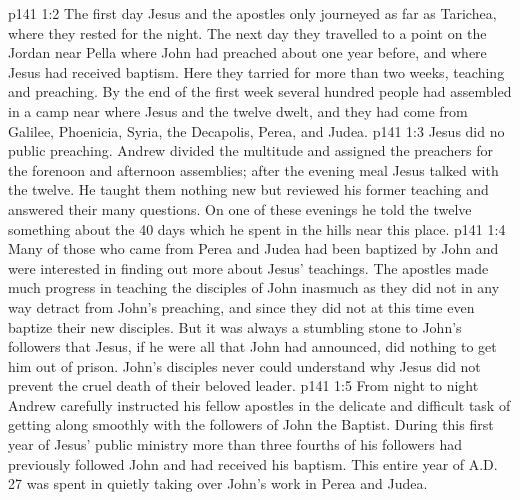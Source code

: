 \vs p141 1:2 The first day Jesus and the apostles only journeyed as far as Tarichea, where they rested for the night. The next day they travelled to a point on the Jordan near Pella where John had preached about one year before, and where Jesus had received baptism. Here they tarried for more than two weeks, teaching and preaching. By the end of the first week several hundred people had assembled in a camp near where Jesus and the twelve dwelt, and they had come from Galilee, Phoenicia, Syria, the Decapolis, Perea, and Judea.
\vs p141 1:3 Jesus did no public preaching. Andrew divided the multitude and assigned the preachers for the forenoon and afternoon assemblies; after the evening meal Jesus talked with the twelve. He taught them nothing new but reviewed his former teaching and answered their many questions. On one of these evenings he told the twelve something about the 40 days which he spent in the hills near this place.
\vs p141 1:4 Many of those who came from Perea and Judea had been baptized by John and were interested in finding out more about Jesus’ teachings. The apostles made much progress in teaching the disciples of John inasmuch as they did not in any way detract from John’s preaching, and since they did not at this time even baptize their new disciples. But it was always a stumbling stone to John’s followers that Jesus, if he were all that John had announced, did nothing to get him out of prison. John’s disciples never could understand why Jesus did not prevent the cruel death of their beloved leader.
\vs p141 1:5 From night to night Andrew carefully instructed his fellow apostles in the delicate and difficult task of getting along smoothly with the followers of John the Baptist. During this first year of Jesus’ public ministry more than three fourths of his followers had previously followed John and had received his baptism. This entire year of A.D.\,27 was spent in quietly taking over John’s work in Perea and Judea.
